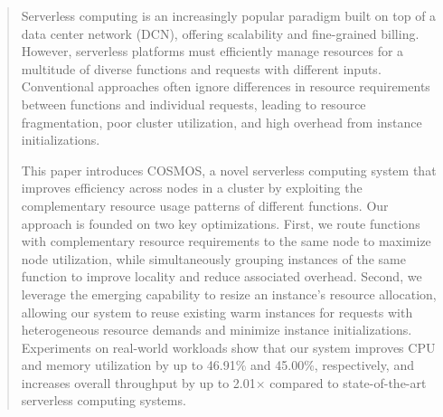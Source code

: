 \begin{abstract}

Serverless computing is an increasingly popular paradigm built on top of a data center network (DCN), offering scalability and fine-grained billing. However, serverless platforms must efficiently manage resources for a multitude of diverse functions and requests with different inputs. Conventional approaches often ignore differences in resource requirements between functions and individual requests, leading to resource fragmentation, poor cluster utilization, and high overhead from instance initializations.

This paper introduces COSMOS, a novel serverless computing system that improves efficiency across nodes in a cluster by exploiting the complementary resource usage patterns of different functions. Our approach is founded on two key optimizations. First, we route functions with complementary resource requirements to the same node to maximize node utilization, while simultaneously grouping instances of the same function to improve locality and reduce associated overhead. Second, we leverage the emerging capability to resize an instance's resource allocation, allowing our system to reuse existing warm instances for requests with heterogeneous resource demands and minimize instance initializations. Experiments on real-world workloads show that our system improves CPU and memory utilization by up to 46.91\% and 45.00\%, respectively, and increases overall throughput by up to 2.01$\times$ compared to state-of-the-art serverless computing systems.

\end{abstract}
